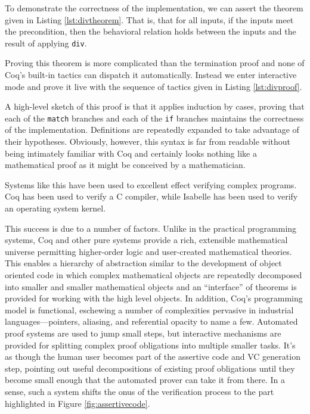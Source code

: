 To demonstrate the correctness of the implementation, we can assert the theorem given in Listing \ref{lst:divtheorem}.  That is, that for all inputs, if the inputs meet the precondition, then the behavioral relation holds between the inputs and the result of applying \texttt{div}.



Proving this theorem is more complicated than the termination proof and none of Coq's built-in tactics can dispatch it automatically.  Instead we enter interactive mode and prove it live with the sequence of tactics given in Listing \ref{lst:divproof}.



A high-level sketch of this proof is that it applies induction by cases, proving that each of the \texttt{match} branches and each of the \texttt{if} branches maintains the correctness of the implementation.  Definitions are repeatedly expanded to take advantage of their hypotheses.  Obviously, however, this syntax is far from readable without being intimately familiar with Coq and certainly looks nothing like a mathematical proof as it might be conceived by a mathematician.

Systems like this have been used to excellent effect verifying complex programs.  Coq has been used to verify a C compiler\cite{leroyVerifiedcompiler}, while Isabelle has been used to verify an operating system kernel\cite {kleinVerifiedOS}.

This success is due to a number of factors.  Unlike in the practical programming systems, Coq and other pure systems provide a rich, extensible mathematical universe permitting higher-order logic and user-created mathematical theories.  This enables a hierarchy of abstraction similar to the development of object oriented code in which complex mathematical objects are repeatedly decomposed into smaller and smaller mathematical objects and an ``interface'' of theorems is provided for working with the high level objects.  In addition, Coq's programming model is functional, eschewing a number of complexities pervasive in industrial languages---pointers, aliasing, and referential opacity to name a few.  Automated proof systems are used to jump small steps, but interactive mechanisms are provided for splitting complex proof obligations into multiple smaller tasks.  It's as though the human user becomes part of the assertive code and VC generation step, pointing out useful decompositions of existing proof obligations until they become small enough that the automated prover can take it from there.  In a sense, such a system shifts the onus of the verification process to the part highlighted in Figure \ref{fig:assertivecode}.

